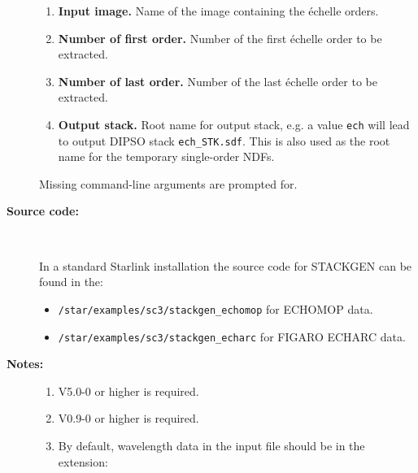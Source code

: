 \documentclass[twoside,11pt]{starlink}
\begin{document}
\begin{description}
\begin{enumerate}
\item \textbf{Input image.}
      Name of the image containing the \'{e}chelle orders.

\item \textbf{Number of first order.}
      Number of the first \'{e}chelle order to be extracted.

\item \textbf{Number of last order.}
      Number of the last \'{e}chelle order to be extracted.

\item \textbf{Output stack.}
      Root name for output stack, e.g. a value \verb+ech+ will
      lead to output DIPSO stack \texttt{ech\_STK.sdf}.  This is also used
      as the root name for the temporary single-order NDFs.

\end{enumerate}

     Missing command-line arguments are prompted for.

\item [\textbf{Source code:}] \mbox{} \\
\begin{latexonly}
In a standard Starlink installation the source code for STACKGEN can be found
in the:
\begin{itemize}

\item \texttt{/star/examples/sc3/stackgen\_echomop} for ECHOMOP data.

\item \texttt{/star/examples/sc3/stackgen\_echarc} for FIGARO ECHARC data.

\end{itemize}
\end{latexonly}



\item [\textbf{Notes:}] \mbox{}
\begin{enumerate}

\item {} V5.0-0 or higher is required.

\item {} V0.9-0 or higher is required.

\item By default, wavelength data in the input file should be in the
      extension:

\begin{itemize}


\end{itemize}
\end{enumerate}
\end{description}
\end{document}
